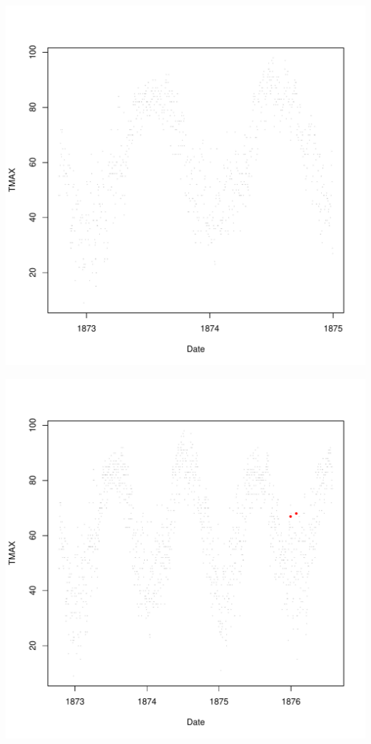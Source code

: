 \documentclass{article}\usepackage[]{graphicx}\usepackage[]{color}
\makeatletter
\def\maxwidth{ %
  \ifdim\Gin@nat@width>\linewidth
    \linewidth
  \else
    \Gin@nat@width
  \fi
}
\newenvironment{knitrout}{}{} %
\makeatother
\begin{document}
\begin{knitrout}
\includegraphics[width=\maxwidth]{figure/unnamed-chunk-4-2} 

\includegraphics[width=\maxwidth]{figure/unnamed-chunk-4-3} 


\end{knitrout}
\end{document}
